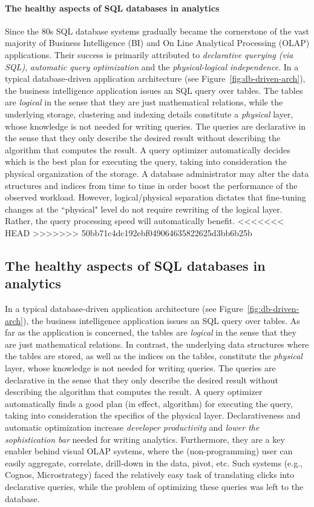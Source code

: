 \paragraph{The healthy aspects of SQL databases in analytics}
Since the 80s SQL database systems gradually became the cornerstone of
the vast majority of Business Intelligence (BI) and On Line Analytical
Processing (OLAP) applications. 
Their success is primarily attributed to {\em declarative querying
(via SQL)}, {\em automatic query optimization} and the {\em
physical-logical independence}. In a typical database-driven
application architecture (see Figure~\ref{fig:db-driven-arch}), the
business intelligence application issues an SQL query over tables. The
tables are {\em logical} in the sense that they are just mathematical
relations, while the underlying storage, clustering and indexing
details constitute a {\em physical} layer, whose knowledge is not
needed for writing queries. The queries are declarative in the sense
that they only describe the desired result without describing the
algorithm that computes the result. A query optimizer automatically
decides which is the best plan for executing the query, taking into
consideration the physical organization of the storage. A database
administrator may alter the data structures and indices from time to
time in order boost the performance of the observed workload. However,
logical/physical separation dictates that fine-tuning changes at the ``physical" level do not require rewriting of the logical layer. Rather, the query processing speed will automatically benefit.
<<<<<<< HEAD
>>>>>>> 50bb71c4dc192ebf049064635822625d3bb6b25b


\subsection{The healthy aspects of SQL databases in analytics}
\label{sec:healthy-aspects}
In a typical database-driven application architecture (see Figure~\ref{fig:db-driven-arch}), the business intelligence application issues an SQL query over tables. As far as the application is concerned, the tables are {\em logical} in the sense that they are just mathematical relations. In contrast, the underlying data structures where the tables are stored, as well as the indices on the tables, constitute the {\em physical} layer, whose knowledge is not needed for writing queries. The queries are declarative in the sense that they only describe the desired result without describing the algorithm that computes the result. A query optimizer automatically finds a good plan (in effect, algorithm) for executing the query, taking into consideration the specifics of the physical layer. Declarativeness and automatic optimization increase {\em developer productivity} and {\em lower the sophistication bar} needed for writing analytics. Furthermore, they are a key enabler behind visual OLAP systems, where the (non-programming) user can easily aggregate, correlate, drill-down in the data, pivot, etc. Such systems (e.g., Cognos, Microstrategy) faced the relatively easy task of translating clicks into declarative queries, while the problem of optimizing these queries was left to the database.

